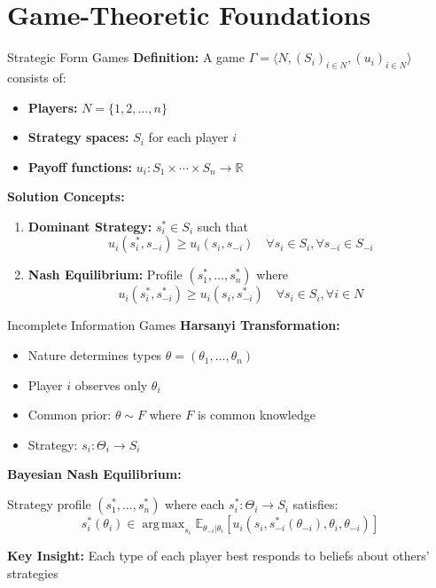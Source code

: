 \documentclass[xcolor={x11names}]{beamer}
\DeclareMathOperator*{\argmax}{arg\,max}
\begin{document}
\section{Game-Theoretic Foundations}

\begin{frame}{Strategic Form Games}
\textbf{Definition:} A game $\Gamma = \langle N, (S_i)_{i \in N}, (u_i)_{i \in N} \rangle$ consists of:
\begin{itemize}
  \item \textbf{Players:} $N = \{1, 2, \ldots, n\}$
  \item \textbf{Strategy spaces:} $S_i$ for each player $i$
  \item \textbf{Payoff functions:} $u_i: S_1 \times \cdots \times S_n \to \mathbb{R}$
\end{itemize}


\textbf{Solution Concepts:}
\begin{enumerate}
  \item \textbf{Dominant Strategy:} $s_i^* \in S_i$ such that
  \[u_i(s_i^*, s_{-i}) \geq u_i(s_i, s_{-i}) \quad \forall s_i \in S_i, \forall s_{-i} \in S_{-i}\]
  
  \item \textbf{Nash Equilibrium:} Profile $(s_1^*, \ldots, s_n^*)$ where
  \[u_i(s_i^*, s_{-i}^*) \geq u_i(s_i, s_{-i}^*) \quad \forall s_i \in S_i, \forall i \in N\]
\end{enumerate}
\end{frame}

\begin{frame}{Incomplete Information Games}
\textbf{Harsanyi Transformation:}
\begin{itemize}
  \item Nature determines types $\theta = (\theta_1, \ldots, \theta_n)$
  \item Player $i$ observes only $\theta_i$
  \item Common prior: $\theta \sim F$ where $F$ is common knowledge
  \item Strategy: $s_i: \Theta_i \to S_i$
\end{itemize}


\textbf{Bayesian Nash Equilibrium:}

Strategy profile $(s_1^*, \ldots, s_n^*)$ where each $s_i^*: \Theta_i \to S_i$ satisfies:
\[s_i^*(\theta_i) \in \argmax_{s_i} \mathbb{E}_{\theta_{-i}|\theta_i}[u_i(s_i, s_{-i}^*(\theta_{-i}), \theta_i, \theta_{-i})]\]


\textbf{Key Insight:} Each type of each player best responds to beliefs about others' strategies
\end{frame}
\end{document}

